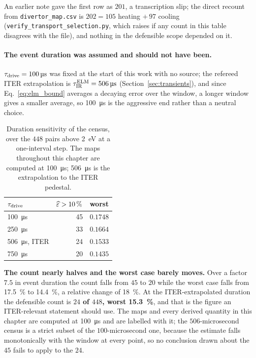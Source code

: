 An earlier note gave the first row as $201$, a transcription slip; the direct
recount from \texttt{divertor\_map.csv} is $202 = 105$ heating $+\,97$ cooling
(\texttt{verify\_transport\_selection.py}, which raises if any count in this
table disagrees with the file), and nothing in the defensible scope depended on
it.

\paragraph{The event duration was assumed and should not have been.}
$\tau_{\mathrm{drive}} = \SI{100}{\micro\second}$ was fixed at the start of this work with
no source; the refereed ITER extrapolation is
$\tau^{\rm ELM}_{\rm IR} = \SI{506}{\micro\second}$ \cite[Sec.~5]{Loarte2003}
(Section~\ref{sec:transients}), and since Eq.~\eqref{eq:elm_bound} averages a
decaying error over the window, a longer window gives a smaller average, so
\SI{100}{\micro\second} is the aggressive end rather than a neutral choice.

\begin{table}[htbp]
\centering
\caption{Duration sensitivity of the census, over the $448$ pairs above
\SI{2}{\electronvolt} at a one-interval step. The maps throughout this chapter
are computed at \SI{100}{\micro\second}; \SI{506}{\micro\second} is the
extrapolation to the ITER pedestal.}
\label{tab:duration_sensitivity}
\begin{tabular}{lrl}
  \toprule
  $\tau_{\mathrm{drive}}$ & $\widehat{\varepsilon} >\SI{10}{\percent}$ & worst \\
  \midrule
  \SI{100}{\micro\second} & 45 & $0.1748$ \\
  \SI{250}{\micro\second} & 33 & $0.1664$ \\
  \SI{506}{\micro\second}, ITER & 24 & $0.1533$ \\
  \SI{750}{\micro\second} & 20 & $0.1435$ \\
  \bottomrule
\end{tabular}
\end{table}

\textbf{The count nearly halves and the worst case barely moves.} Over a
factor $7.5$ in event duration the count falls from $45$ to $20$ while the worst
case falls from \SI{17.5}{\percent} to \SI{14.4}{\percent}, a relative change of
\SI{18}{\percent}. At the ITER-extrapolated duration the defensible count is
\textbf{$24$ of $448$, worst \SI{15.3}{\percent}}, and that is the figure an
ITER-relevant statement should use. The maps and every derived quantity in this
chapter are computed at \SI{100}{\micro\second} and are labelled with it; the
$506$-microsecond census is a strict subset of the $100$-microsecond one,
because the estimate falls monotonically with the window at every point, so no
conclusion drawn about the $45$ fails to apply to the $24$.

